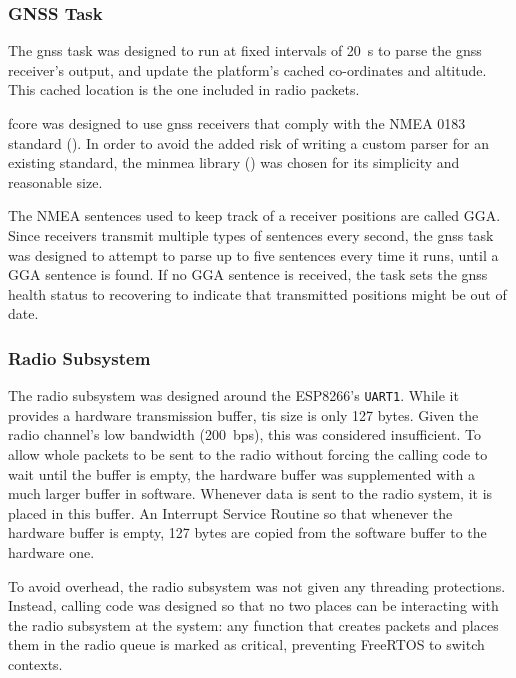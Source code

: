 \subsubsection{GNSS Task}

The \acrshort{gnss} task was designed to run at fixed intervals of
\SI{20}{\second} to parse the \acrshort{gnss} receiver's output, and update the
platform's cached co-ordinates and altitude. This cached location is the one
included in radio packets.

\acrshort{fcore} was designed to use \acrshort{gnss} receivers that comply with
the NMEA 0183 standard (\cite{Bekte2001}). In order to avoid the added risk of
writing a custom parser for an existing standard, the minmea library
(\cite{Moczek2016}) was chosen for its simplicity and reasonable size.

The NMEA sentences used to keep track of a receiver positions are called GGA.
Since receivers transmit multiple types of sentences every second, the
\acrshort{gnss} task was designed to attempt to parse up to five sentences
every time it runs, until a GGA sentence is found. If no GGA sentence is 
received, the task sets the \acrshort{gnss} health status to recovering to
indicate that transmitted positions might be out of date.

\subsubsection{Radio Subsystem}

The radio subsystem was designed around the ESP8266's \texttt{UART1}. While it
provides a hardware transmission buffer, tis size is only 127 bytes. Given the
radio channel's low bandwidth (\SI{200}{bps}), this was considered insufficient.
To allow whole packets to be sent to the radio without forcing the calling code
to wait until the buffer is empty, the hardware buffer was supplemented with
a much larger buffer in software. Whenever data is sent to the radio system,
it is placed in this buffer. An Interrupt Service Routine so that whenever the
hardware buffer is empty, 127 bytes are copied from the software buffer to the
hardware one.

To avoid overhead, the radio subsystem was not given any threading protections.
Instead, calling code was designed so that no two places can be interacting with
the radio subsystem at the system: any function that creates packets and places
them in the radio queue is marked as critical, preventing FreeRTOS to switch
contexts.

